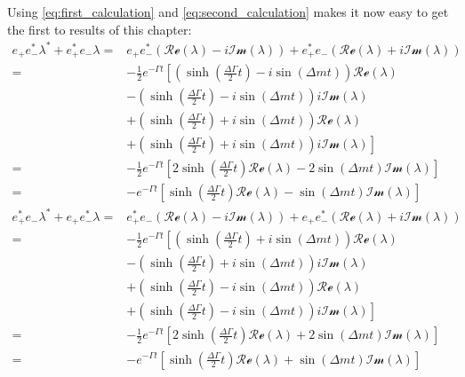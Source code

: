 Using \cref{eq:first_calculation} and \cref{eq:second_calculation} makes it now easy to get the first to results of this chapter:
\begin{align}
  e_{+}e_{-}^*\lambda^{\ast}+e_+^*e_-\lambda =& e_+e_-^*\left(\mathcal{Re}(\lambda)-i\mathcal{Im}(\lambda)\right)
  + e_+^*e_-\left(\mathcal{Re}(\lambda)+i\mathcal{Im}(\lambda)\right)\nonumber\\
  =& -\frac{1}{2}e^{-\Gamma t}\left[\left(\sinh\left(\frac{\Delta\Gamma}{2}t\right)-i\sin\left(\Delta m t\right)\right)\mathcal{Re}(\lambda)\right.\nonumber\\
  &-\left(\sinh\left(\frac{\Delta\Gamma}{2}t\right)-i\sin\left(\Delta m t\right)\right)i\mathcal{Im}(\lambda)\nonumber\\
  &+\left(\sinh\left(\frac{\Delta\Gamma}{2}t\right)+i\sin\left(\Delta m t\right)\right)\mathcal{Re}(\lambda)\nonumber\\
  &+\left.\left(\sinh\left(\frac{\Delta\Gamma}{2}t\right)+i\sin\left(\Delta m t\right)\right)i\mathcal{Im}(\lambda)\right]\nonumber\\
  =&-\frac{1}{2}e^{-\Gamma t}\left[2\sinh\left(\frac{\Delta\Gamma}{2}t\right)\mathcal{Re}(\lambda)-2\sin\left(\Delta mt\right)\mathcal{Im}(\lambda)\right]\nonumber\\
  =&-e^{-\Gamma t}\left[\sinh\left(\frac{\Delta\Gamma}{2}t\right)\mathcal{Re}(\lambda)-\sin\left(\Delta mt\right)\mathcal{Im}(\lambda)\right]\label{eq:result_1}\\
  e_{+}^*e_{-}\lambda^{\ast}+e_+e_-^*\lambda =& e_+^*e_-\left(\mathcal{Re}(\lambda)-i\mathcal{Im}(\lambda)\right)
  + e_+e_-^*\left(\mathcal{Re}(\lambda)+i\mathcal{Im}(\lambda)\right)\nonumber\\
  =& -\frac{1}{2}e^{-\Gamma t}\left[\left(\sinh\left(\frac{\Delta\Gamma}{2}t\right)+i\sin\left(\Delta m t\right)\right)\mathcal{Re}(\lambda)\right.\nonumber\\
  &-\left(\sinh\left(\frac{\Delta\Gamma}{2}t\right)+i\sin\left(\Delta m t\right)\right)i\mathcal{Im}(\lambda)\nonumber\\
  &+\left(\sinh\left(\frac{\Delta\Gamma}{2}t\right)-i\sin\left(\Delta m t\right)\right)\mathcal{Re}(\lambda)\nonumber\\
  &+\left.\left(\sinh\left(\frac{\Delta\Gamma}{2}t\right)-i\sin\left(\Delta m t\right)\right)i\mathcal{Im}(\lambda)\right]\nonumber\\
  =&-\frac{1}{2}e^{-\Gamma t}\left[2\sinh\left(\frac{\Delta\Gamma}{2}t\right)\mathcal{Re}(\lambda)+2\sin\left(\Delta mt\right)\mathcal{Im}(\lambda)\right]\nonumber\\
  =&-e^{-\Gamma t}\left[\sinh\left(\frac{\Delta\Gamma}{2}t\right)\mathcal{Re}(\lambda)+\sin\left(\Delta mt\right)\mathcal{Im}(\lambda)\right]\label{eq:result_2}
\end{align}
